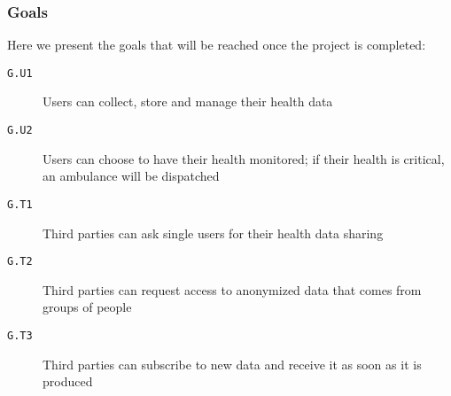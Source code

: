       \subsubsection{Goals}
      \label{sec:goals}

        Here we present the goals that will be reached once the project is completed:

        \begin{description}
          \item[\texttt{G.U1}] Users can collect, store and manage their health data
          \item[\texttt{G.U2}] Users can choose to have their health monitored; if their health is critical, an ambulance will be dispatched
          \item[\texttt{G.T1}] Third parties can ask single users for their health data sharing
          \item[\texttt{G.T2}] Third parties can request access to anonymized data that comes from groups of people
          \item[\texttt{G.T3}] Third parties can subscribe to new data and receive it as soon as it is produced
        \end{description}


